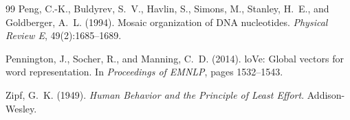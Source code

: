 \documentclass[preprint]{elsarticle}
\begin{document}
\begin{thebibliography}{99}
Peng, C.-K., Buldyrev, S.~V., Havlin, S., Simons, M., Stanley,
  H.~E., and Goldberger, A.~L. (1994).
\newblock Mosaic organization of {DNA} nucleotides.
\newblock \emph{Physical Review E}, 49(2):1685--1689.

Pennington, J., Socher, R., and Manning, C.~D. (2014).
lo{V}e: Global vectors for word representation.
\newblock In \emph{Proceedings of EMNLP}, pages 1532--1543.

Zipf, G.~K. (1949).
\newblock \emph{Human Behavior and the Principle of Least Effort}.
\newblock Addison-Wesley.

\end{thebibliography}
\end{document}
